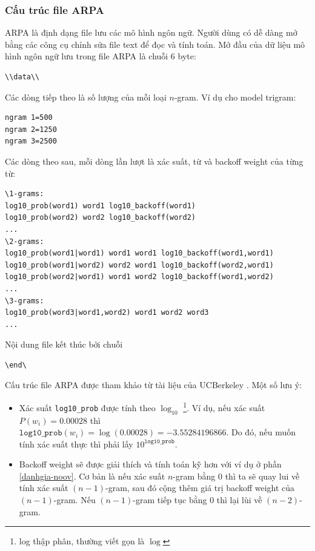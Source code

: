 \documentclass[12pt]{article}
\begin{document}
\subsubsection{Cấu trúc file ARPA}
ARPA là định dạng file lưu các mô hình ngôn ngữ. Người dùng có dễ dàng mở bằng các công cụ chỉnh sửa file text để đọc và tính toán. Mở đầu của dữ liệu mô hình ngôn ngữ lưu trong file ARPA là chuỗi 6 byte:
\begin{lstlisting}
\\data\\
\end{lstlisting}
Các dòng tiếp theo là số lượng của mỗi loại $n$-gram. Ví dụ cho model trigram:
\begin{lstlisting}
ngram 1=500
ngram 2=1250
ngram 3=2500
\end{lstlisting}
Các dòng theo sau, mỗi dòng lần lượt là xác suất, từ và backoff weight của từng từ:
\begin{lstlisting}
\1-grams:
log10_prob(word1) word1 log10_backoff(word1)
log10_prob(word2) word2 log10_backoff(word2)
...
\2-grams:
log10_prob(word1|word1) word1 word1 log10_backoff(word1,word1)
log10_prob(word1|word2) word2 word1 log10_backoff(word2,word1)
log10_prob(word2|word1) word1 word2 log10_backoff(word1,word2)
...
\3-grams:
log10_prob(word3|word1,word2) word1 word2 word3
...
\end{lstlisting}
Nội dung file kết thúc bởi chuỗi
\begin{lstlisting}
\end\
\end{lstlisting}
Cấu trúc file ARPA được tham khảo từ tài liệu của UCBerkeley \cite{arpa-definition}.
Một số lưu ý: 
\begin{itemize}
\item Xác suất \texttt{log10\_prob} được tính theo $\log_{10}$ \footnote{log thập phân, thường viết gọn là $\log$}. Ví dụ, nếu xác suất $P(w_i) = 0.00028$ thì $\texttt{log10\_prob}(w_i)= \log(0.00028) = -3.55284196866$. Do đó, nếu muốn tính xác suất thực thì phải lấy $10^{\texttt{log10\_prob}}$.
\item Backoff weight sẽ được giải thích và tính toán kỹ hơn với ví dụ ở phần \ref{danhgia-noov}. Cơ bản là nếu xác suất $n$-gram bằng 0 thì ta sẽ quay lui về tính xác suất $(n - 1)$-gram, sau đó cộng thêm giá trị backoff weight của $(n - 1)$-gram. Nếu $(n - 1)$-gram tiếp tục bằng 0 thì lại lùi về $(n - 2)$-gram.
\end{itemize}
\end{document}
